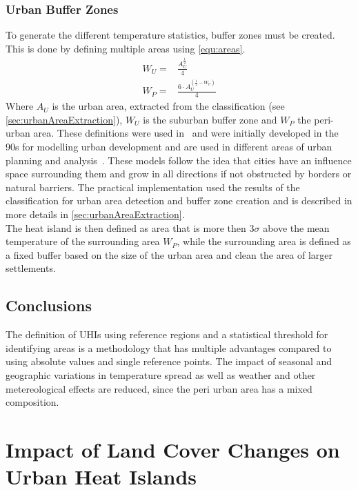 \documentclass[12pt,a4paper, english,twoside]{scrartcl}
\begin{document}
    \subsubsection{Urban Buffer Zones}\label{sec:urbanBufferzone}
      To generate the different temperature statistics, buffer zones must be created.
      This is done by defining multiple areas using \cref{equ:areas}.
      \begin{equation}\label{equ:areas}
        \begin{split}
          W_U = & \frac{A_U^{\frac{1}{2}}}{4} \\
          W_P = & \frac{6\cdot A_U^{(\frac{1}{2}-W_U)}}{4}
        \end{split}
      \end{equation}
      Where $A_U$ is the urban area, extracted from the classification (see \cref{sec:urbanAreaExtraction}), $W_U$ is the suburban buffer zone and $W_P$ the peri-urban area.
      These definitions were used in~\cite{Sobrino2020} and were initially developed in the 90s for modelling urban development and are used in different areas of urban planning and analysis~\autocite[see]{AlkanBala2014}.
      These models follow the idea that cities have an influence space surrounding them and grow in all directions if not obstructed by borders or natural barriers. 
      The practical implementation used the results of the classification for urban area detection and buffer zone creation and is described in more details in \cref{sec:urbanAreaExtraction}. \\
      The heat island is then defined as area that is more then $3\sigma$ above the mean temperature of the surrounding area $W_P$, while the surrounding area is defined as a fixed buffer based on the size of the urban area and clean the area of larger settlements. 
    \subsection{Conclusions}
    The definition of \glspl{UHI} using reference regions and a statistical threshold for identifying areas is a methodology that has multiple advantages compared to using absolute values and single reference points. 
    The impact of seasonal and geographic variations in temperature spread as well as weather and other metereological effects are reduced, since the peri urban area has a mixed composition. 

\newpage
\section{Impact of Land Cover Changes on Urban Heat Islands}\label{sec:LULC}
\end{document}
